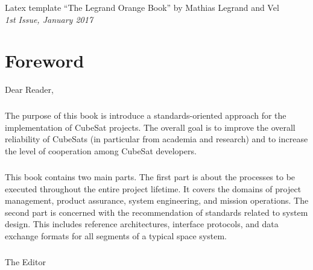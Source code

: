 \documentclass[11pt,fleqn]{book} %
\begin{document}
\noindent Latex template ``The Legrand Orange Book'' by Mathias Legrand and Vel \\

\noindent \textit{1st Issue, January 2017} %


\chapter*{Foreword}

Dear Reader,

\paragraph{}

The purpose of this book is introduce a standards-oriented approach for the implementation of CubeSat projects. The overall goal is to improve the overall reliability of CubeSats (in particular from academia and research) and to increase the level of cooperation among CubeSat developers.  

\paragraph{}

This book contains two main parts. The first part is about the processes to be executed throughout the entire project lifetime. It covers the domains of project management, product assurance, system engineering, and mission operations. The second part is concerned with the recommendation of standards related to system design. This includes reference architectures, interface protocols, and data exchange formats for all segments of a typical space system. 

\paragraph{}

\begin{flushright}
The Editor
\end{flushright}

\end{document}
